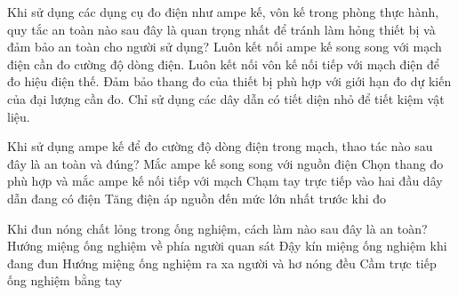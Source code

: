 \begin{ex}
Khi sử dụng các dụng cụ đo điện như ampe kế, vôn kế trong phòng thực hành, quy tắc an toàn nào sau đây là quan trọng nhất để tránh làm hỏng thiết bị và đảm bảo an toàn cho người sử dụng?
\choice
{Luôn kết nối ampe kế song song với mạch điện cần đo cường độ dòng điện.}
{Luôn kết nối vôn kế nối tiếp với mạch điện để đo hiệu điện thế.}
{\True Đảm bảo thang đo của thiết bị phù hợp với giới hạn đo dự kiến của đại lượng cần đo.}
{Chỉ sử dụng các dây dẫn có tiết diện nhỏ để tiết kiệm vật liệu.}
\end{ex}

\begin{ex}
Khi sử dụng ampe kế để đo cường độ dòng điện trong mạch, thao tác nào sau đây là an toàn và đúng?
\choice
{Mắc ampe kế song song với nguồn điện}
{\True Chọn thang đo phù hợp và mắc ampe kế nối tiếp với mạch}
{Chạm tay trực tiếp vào hai đầu dây dẫn đang có điện}
{Tăng điện áp nguồn đến mức lớn nhất trước khi đo}
\end{ex}

\begin{ex}
Khi đun nóng chất lỏng trong ống nghiệm, cách làm nào sau đây là an toàn?
\choice
{Hướng miệng ống nghiệm về phía người quan sát}
{Đậy kín miệng ống nghiệm khi đang đun}
{\True Hướng miệng ống nghiệm ra xa người và hơ nóng đều}
{Cầm trực tiếp ống nghiệm bằng tay}
\end{ex}

